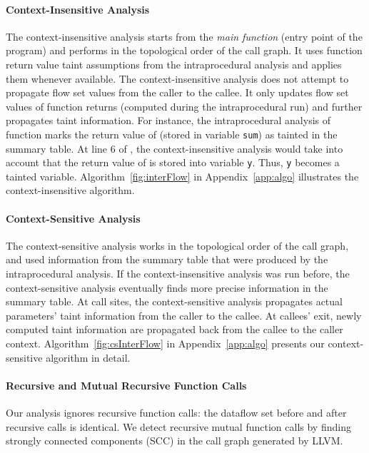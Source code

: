 \paragraph{Context-Insensitive Analysis}
The context-insensitive analysis starts from the
\textit{main function} (entry point of the program) and
performs in the topological order of the call graph.
It uses function return value taint assumptions from the
intraprocedural analysis and applies them whenever available.
The context-insensitive analysis does not attempt
to propagate flow set values from the caller to the callee.
It only updates flow set values of function returns
(computed during the intraprocedural run) and further
propagates taint information.
For instance, the intraprocedural analysis of function
\main{} marks the return value of \compute
(stored in variable \texttt{sum}) as tainted in the summary
table. At line $6$ of \main, the context-insensitive analysis 
would take into account that the return value of \compute
is stored into variable \texttt{y}. Thus, \texttt{y}
becomes a tainted variable.
Algorithm~\ref{fig:interFlow} in Appendix~\ref{app:algo}
illustrates the context-insensitive algorithm.

\paragraph{Context-Sensitive Analysis}
The context-sensitive analysis works in the topological order
of the call graph, and used information from the summary table
that were produced by the intraprocedural analysis. If the
context-insensitive analysis was run before, the context-sensitive
analysis eventually finds more precise information in the summary
table.
At call sites, the context-sensitive analysis propagates
actual parameters' taint information from the caller to the
callee. At callees' exit, newly computed taint information
are propagated back from the callee to the caller context.
Algorithm~\ref{fig:csInterFlow} in Appendix~\ref{app:algo}
presents our context-sensitive algorithm in detail.

\paragraph{Recursive and Mutual Recursive Function Calls} 
Our analysis ignores recursive function calls: the dataflow set
before and after recursive calls is identical.
We detect recursive mutual function calls by finding strongly
connected components (SCC) in the call graph generated by LLVM.

